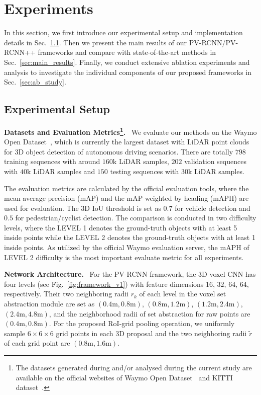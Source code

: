 \documentclass[natbib,twocolumn]{svjour3}          \smartqed  \usepackage{graphicx}
\begin{document}
\section{Experiments}
In this section, we first introduce our experimental setup and implementation details in Sec.~\ref{sec:exp_setup}. 
Then we present the main results of our PV-RCNN/PV-RCNN++ frameworks and compare with state-of-the-art methods in Sec.~\ref{sec:main_results}. 
Finally, we conduct extensive ablation experiments and analysis to investigate the individual components of our proposed frameworks in Sec.~\ref{sec:ab_study}.


\subsection{Experimental Setup}\label{sec:exp_setup}

\noindent
\textbf{Datasets and Evaluation Metrics\footnote{The datasets generated during and/or analysed during the current study are available on the official websites of Waymo Open Dataset~\citep{Sun_2020_CVPR} and KITTI dataset~\citep{Geiger2012CVPR}.}.}~
We evaluate our methods on the Waymo Open Dataset~\citep{Sun_2020_CVPR}, which is currently the largest dataset with LiDAR point clouds for 3D object detection of autonomous driving scenarios. There are totally $798$ training sequences with around $160$k LiDAR samples, $202$ validation sequences with $40$k LiDAR samples and $150$ testing sequences with $30$k LiDAR samples.  



The evaluation metrics are calculated by the official evaluation tools, where the mean average precision (mAP) and the mAP weighted by heading (mAPH) are used for evaluation. The 3D IoU threshold is set as $0.7$ for vehicle detection and $0.5$ for pedestrian/cyclist detection.
The comparison is conducted in two difficulty levels, where the LEVEL 1 denotes the ground-truth objects with at least 5 inside points while the LEVEL 2 denotes the ground-truth objects with at least 1 inside points. 
As utilized by the official Waymo evaluation server, the mAPH of LEVEL 2 difficulty is the most important evaluate metric for all experiments.

\noindent
\textbf{Network Architecture.}~
For the PV-RCNN framework, the 3D voxel CNN has four levels (see Fig.~\ref{fig:framework_v1}) with feature dimensions $16$, $32$, $64$, $64$, respectively. Their two neighboring radii $r_k$ of each level in the voxel set abstraction module are set as $(0.4\text{m}, 0.8\text{m})$, $(0.8\text{m},1.2\text{m})$, $(1.2\text{m}, 2.4\text{m})$, $(2.4\text{m}, 4.8\text{m})$, and 
the neighborhood radii of set abstraction for raw points are $(0.4\text{m}, 0.8\text{m})$. 
For the proposed RoI-grid pooling operation, we uniformly sample $6\times6\times6$ grid points in each 3D proposal and the two neighboring radii $\tilde{r}$ of each grid point are $(0.8\text{m}, 1.6\text{m})$. 
\end{document}
